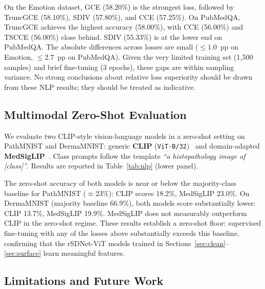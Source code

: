 On the Emotion dataset, GCE (58.20\%) is the strongest loss, followed by
TruncGCE (58.10\%), SDIV (57.80\%), and CCE (57.25\%).
On PubMedQA, TruncGCE achieves the highest accuracy (58.00\%), with
CCE (56.00\%) and TSCCE (56.00\%) close behind.
SDIV (55.33\%) is at the lower end on PubMedQA.
The absolute differences across losses are small ($\leq 1.0$~pp on Emotion,
$\leq 2.7$~pp on PubMedQA).
Given the very limited training set (1{,}500 samples) and brief fine-tuning
(3 epochs), these gaps are within sampling variance.
No strong conclusions about relative loss superiority should be drawn from
these NLP results; they should be treated as indicative.

\subsection{Multimodal Zero-Shot Evaluation}
\label{sec:multimodal}

We evaluate two CLIP-style vision-language models in a zero-shot setting
on PathMNIST and DermaMNIST:
generic \textbf{CLIP} (\texttt{ViT-B/32})~\citep{CLIP} and
domain-adapted \textbf{MedSigLIP}~\citep{MedSigLIP}.
Class prompts follow the template \emph{``a histopathology image of [class]''}.
Results are reported in Table~\ref{tab:nlp} (lower panel).

The zero-shot accuracy of both models is near or below the majority-class
baseline for PathMNIST ($\approx23\%$): CLIP scores 18.2\%,
MedSigLIP 23.0\%.
On DermaMNIST (majority baseline 66.9\%), both models score substantially
lower: CLIP 13.7\%, MedSigLIP 19.9\%.
MedSigLIP does not measurably outperform CLIP in the zero-shot regime.
These results establish a zero-shot floor: supervised fine-tuning with
any of the losses above substantially exceeds this baseline,
confirming that the rSDNet-ViT models trained in
Sections~\ref{sec:clean}--\ref{sec:surface} learn meaningful features.

\subsection{Limitations and Future Work}
\label{sec:limitations}

